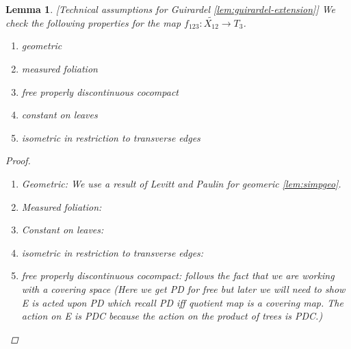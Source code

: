 \documentclass{article}
\theoremstyle{mystyle}
\newtheorem{lem}[thm]{Lemma}
\theoremstyle{remark}
\begin{document}
\begin{lem}
    \label{lem:technicalconditions}
    [Technical assumptions for Guirardel \ref{lem:guirardel-extension}] We check the following properties for the map $f_{123}: \widetilde{X_{12}}\to T_3$.
    \begin{enumerate}
        \item geometric
        \item measured foliation
        \item free properly discontinuous cocompact
        \item constant on leaves
        \item isometric in restriction to transverse edges
    \end{enumerate}
    \label{lem:measuredetc} 
    
    \begin{proof}
    \begin{enumerate}
        \item Geometric: We use a result of Levitt and Paulin for geomeric \ref{lem:simpgeo}.
        \item Measured foliation:
        \item Constant on leaves:
        \item isometric in restriction to transverse edges:
        \item free properly discontinuous cocompact: follows the fact that we are working with a covering space (Here we get PD for free but later we will need to show E is acted upon PD which recall PD iff quotient map is a covering map. The action on E is PDC because the action on the product of trees is PDC.)
    \end{enumerate}
    \end{proof}
    

\end{lem}
\end{document}
